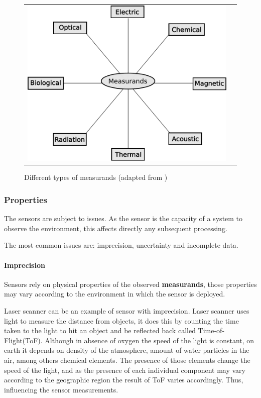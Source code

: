 \begin{figure}[h]
   \centering
     \begin{tabular}{lr}
       \includegraphics[scale=0.70]{img/fig:sensors}
     \end{tabular}
   \caption{Different types of measurands (adapted from \cite{WhiteRichard})}
   \label{fig:sensors}
 \end{figure}

\subsubsection{Properties}

The sensors are subject to issues. As the sensor is the capacity of a system to observe the environment, this affects directly any subsequent processing.

The most common issues are: imprecision, uncertainty and incomplete data. 

\paragraph{Imprecision} Sensors rely on physical properties of the observed \textbf{measurands}, those properties may vary according to the environment in which the sensor is deployed.

Laser scanner can be an example of sensor with imprecision. Laser scanner uses light to measure the distance from objects, it does this by counting the time taken to the light to hit an object and be reflected back called Time-of-Flight(ToF). Although in absence of oxygen the speed of the light is constant, on earth it depends on density of the atmosphere, amount of water particles in the air, among others chemical elements. The presence of those elements change the speed of the light, and as the presence of each individual component may vary according to the geographic region the result of ToF varies accordingly. Thus, influencing the sensor measurements.

